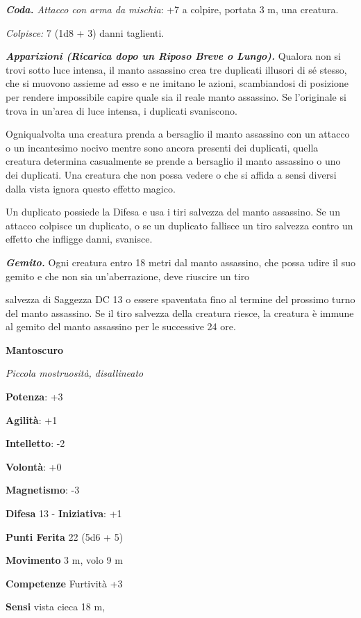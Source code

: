 \begin{multicols}{2}
\emph{\textbf{Coda.} Attacco con arma da mischia}: +7 a colpire, portata
3 m, una creatura.

\emph{Colpisce:} 7 (1d8 + 3) danni taglienti.

\emph{\textbf{Apparizioni (Ricarica dopo un Riposo Breve o Lungo).}}
Qualora non si trovi sotto luce intensa, il manto assassino crea tre
duplicati illusori di sé stesso, che si muovono assieme ad esso e ne
imitano le azioni, scambiandosi di posizione per rendere impossibile
capire quale sia il reale manto assassino. Se l'originale si trova in
un'area di luce intensa, i duplicati svaniscono.

Ogniqualvolta una creatura prenda a bersaglio il manto assassino con un
attacco o un incantesimo nocivo mentre sono ancora presenti dei
duplicati, quella creatura determina casualmente se prende a bersaglio
il manto assassino o uno dei duplicati. Una creatura che non possa
vedere o che si affida a sensi diversi dalla vista ignora questo effetto
magico.

Un duplicato possiede la Difesa e usa i tiri salvezza del manto assassino.
Se un attacco colpisce un duplicato, o se un duplicato fallisce un tiro
salvezza contro un effetto che infligge danni, svanisce.

\emph{\textbf{Gemito.}} Ogni creatura entro 18 metri dal manto
assassino, che possa udire il suo gemito e che non sia un'aberrazione,
deve riuscire un tiro


salvezza di Saggezza DC 13 o essere spaventata fino al termine del
prossimo turno del manto assassino. Se il tiro salvezza della creatura
riesce, la creatura è immune al gemito del manto assassino per le
successive 24 ore.



\textbf{Mantoscuro}

\emph{Piccola mostruosità, disallineato}

\textbf{Potenza}: +3

\textbf{Agilità}: +1

\textbf{Intelletto}: -2

\textbf{Volontà}: +0

\textbf{Magnetismo}: -3

\textbf{Difesa} 13 - \textbf{Iniziativa}: +1

\textbf{Punti Ferita} 22 (5d6 + 5)

\textbf{Movimento} 3 m, volo 9 m

\textbf{Competenze} Furtività +3

\textbf{Sensi} vista cieca 18 m, 


\end{multicols}
